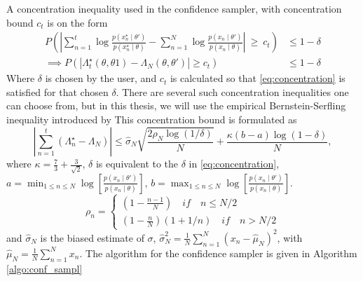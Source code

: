 A concentration inequality used in the confidence sampler, with concentration bound $c_t$ is on the form
\begin{equation}\label{eq:concentration}
\begin{split}
    P\left(\left| \sum_{n = 1}^t \log \frac{p\left(x_n^{\star}\mid \theta'\right)}{p\left(x_n^{\star}\mid \theta\right)} - \sum_{n = 1}^N \log \frac{p\left(x_n\mid\theta'\right)}{p\left(x_n\mid \theta\right)}\right| \:\geq \:c_t\right) &\leq 1 - \delta \\ \implies P\left(\left|\Lambda_t^{\star}\left(\theta, \theta1\right) - \Lambda_N\left(\theta,\theta'\right) \right| \geq c_t \right) &\leq 1 - \delta
    \end{split}
\end{equation}
Where $\delta$ is chosen by the user, and $c_t$ is calculated so that \eqref{eq:concentration} is satisfied for that chosen $\delta$. 
There are several such concentration inequalities one can choose from, but in this thesis, we will use the empirical Bernstein-Serfling inequality introduced by \cite{bardenet2015concentration}
This concentration bound is formulated as 
\begin{equation}\label{eq:BernsteinSerfling}
    \left|\sum_{n = 1}^t \left(\Lambda^{\star}_n - \Lambda_N \right)\right| \leq \hat{\sigma}_N \sqrt{\frac{2\rho_N\log\left(1/\delta\right)}{N}} + \frac{\kappa \left(b-a\right)\log\left(1 - \delta\right)}{N},
\end{equation}{}
where $\kappa = \frac{7}{3} + \frac{3}{\sqrt{2}}$, $\delta$ is equivalent to the $\delta$ in \eqref{eq:concentration}, $a = \min_{1\leq n \leq N}\log\left[\frac{ p\left(x_n\mid \theta'\right)}{ p\left(x_n\mid \theta\right)}\right]$, $b= \max_{1\leq n \leq N} \log\left[\frac{ p\left(x_n\mid \theta'\right)}{ p\left(x_n\mid \theta\right)}\right]$. 
\begin{equation}
    \rho_n =
    \begin{cases}
    \left(1 - \frac{n-1}{N}\right) \quad if \quad n \leq N/2\\
    \left(1  - \frac{n}{N}\right) \left(1 + 1/n\right) \quad if \quad n > N/2
    \end{cases}
\end{equation} and $\hat{\sigma}_N$ is the biased estimate of $\sigma$, $\hat{\sigma}_N^2 = \frac{1}{N}\sum_{n=1}^N \left(x_n - \hat{\mu}_N\right)^2$, with $\hat{\mu}_N = \frac{1}{N}\sum_{n=1}^N x_n$. The algorithm for the confidence sampler is given in Algorithm \ref{algo:conf_sampl}
